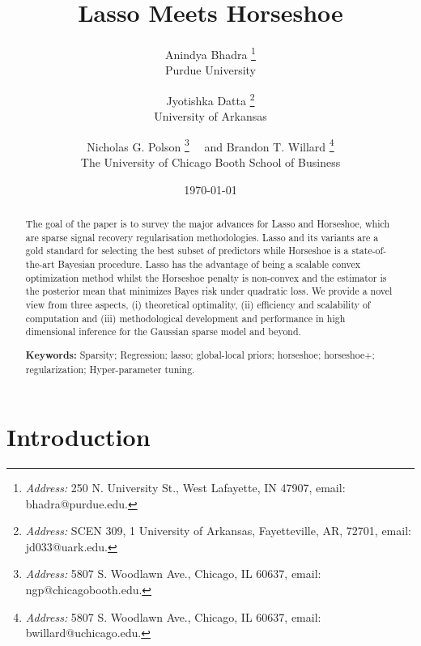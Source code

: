 \documentclass[11pt]{article}
\title{Lasso Meets Horseshoe}
\author{Anindya Bhadra  \footnote{{\em Address:} 250 N. University St., West Lafayette, IN 47907, email: bhadra@purdue.edu.} \\Purdue University
\and Jyotishka Datta  \footnote{{\em Address:} SCEN 309, 1 University of Arkansas, Fayetteville, AR, 72701, email: jd033@uark.edu.}\\ University of Arkansas\\
\and Nicholas G. Polson \footnote{{\em Address:} 5807 S. Woodlawn Ave., Chicago, IL 60637, email: ngp@chicagobooth.edu.}  \ \ and Brandon T. Willard \footnote{{\em Address:} 5807 S. Woodlawn Ave., Chicago, IL 60637, email: bwillard@uchicago.edu.} \\The University of Chicago Booth School of
Business}
\date{\today}
\begin{document}
\maketitle
\onehalfspacing


\begin{abstract}
\baselineskip=15pt
\noindent %
The goal of the paper is to survey the major advances for Lasso and Horseshoe, which are sparse signal recovery regularisation methodologies. Lasso and its variants are a gold standard for selecting the best subset of predictors while Horseshoe is a state-of-the-art Bayesian procedure. Lasso has the advantage of being a scalable convex optimization method whilst the Horseshoe penalty is non-convex and the estimator is the posterior mean that minimizes Bayes risk under quadratic loss.  We provide a novel view from three aspects, (i) theoretical optimality, (ii) efficiency and scalability of computation and (iii) methodological development and performance in high dimensional inference for the Gaussian sparse model and beyond. 


{\bf Keywords:} Sparsity; Regression; lasso; global-local priors; horseshoe; horseshoe+; regularization; Hyper-parameter tuning. 
\end{abstract}

\section{Introduction}


\end{document}
